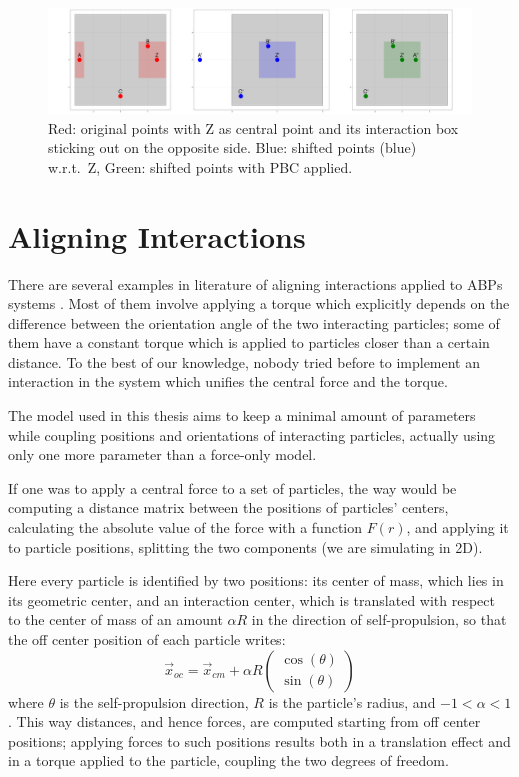 \documentclass[../../master_thesis_np.tex]{subfiles}
\begin{document}
	\begin{figure}[htp]
		\centering
		\includegraphics[width=\textwidth]{periodic_interaction.png}
		\caption{Red: original points with Z as central point and its interaction box sticking out on the opposite side. Blue: shifted points (blue) w.r.t.\ Z, Green: shifted points with PBC applied.}
		\label{fig:periodicint}
	\end{figure}
	
	\section{Aligning Interactions} \label{alignint}

	There are several examples in literature of aligning interactions applied to ABPs systems \cite{martin-gomez_collective_2018, callegari_numerical_2019}. Most of them involve applying a torque which explicitly depends on the difference between the orientation angle of the two interacting particles; some of them have a constant torque which is applied to particles closer than a certain distance. To the best of our knowledge, nobody tried before to implement an interaction in the system which unifies the central force and the torque. 
	
	The model used in this thesis aims to keep a minimal amount of parameters while coupling positions and orientations of interacting particles, actually using only one more parameter than a force-only model.
	
	If one was to apply a central force to a set of particles, the way would be computing a distance matrix between the positions of particles' centers, calculating the absolute value of the force with a function $F(r)$, and applying it to particle positions, splitting the two components (we are simulating in 2D).
	
	Here every particle is identified by two positions: its center of mass, which lies in its geometric center, and an interaction center, which is translated with respect to the center of mass of an amount $\alpha R$ in the direction of self-propulsion, so that the off center position of each particle writes:
	\begin{equation}
		\vec{x}_{oc} = \vec{x}_{cm} + \alpha R 
		\begin{pmatrix}
			\cos(\theta)\\
			\sin(\theta)
		\end{pmatrix}
	\end{equation}
	where $\theta$ is the self-propulsion direction, $R$ is the particle's radius, and $-1 < \alpha < 1$. This way distances, and hence forces, are computed starting from off center positions; applying forces to such positions results both in a translation effect and in a torque applied to the particle, coupling the two degrees of freedom.
	
\end{document}
